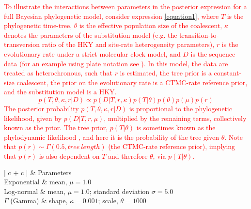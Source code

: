 \documentclass[10pt,letterpaper]{article}
\newlength\savedwidth
\newcommand\thickhline{\noalign{\global\savedwidth\arrayrulewidth\global\arrayrulewidth 2pt}%
\hline
\noalign{\global\arrayrulewidth\savedwidth}}
\begin{document}
\textcolor{red}{To illustrate the interactions between parameters in the posterior expression for a full Bayesian phylogenetic model, consider expression \ref{equation1}, where $T$ is the phylogenetic time-tree, $\theta$ is the effective population size of the coalescent, $\kappa$ denotes the parameters of the substitution model (e.g. the transition-to-transversion ratio of the HKY and site-rate heterogeneity parameters), $r$ is the evolutionary rate under a strict molecular clock model, and $D$ is the sequence data (for an example using plate notation see \cite{hohna2014probabilistic}). In this model, the data are treated as heterochronous, such that $r$ is estimated, the tree prior is a constant-size coalescent, the prior on the evolutionary rate is a CTMC-rate reference prior, and the substitution model is a HKY.
\begin{equation}
\label{equation1}
p(T, \theta, \kappa, r|D) \propto p(D|T, r, \kappa) p(T|\theta) p(\theta) p(\mu) p(r)
\end{equation}
The posterior probability $p(T, \theta, \kappa, r|D)$ is proportional to the phylogenetic likelihood, given by $p(D|T, r, \mu)$, multiplied by the remaining terms, collectively known as the prior. The tree prior, $p(T|\theta)$ is sometimes known as the phylodynamic likelihood \cite{du2015getting}, and here it is the probability of the tree given $\theta$. Note that $p(r)\sim\Gamma(0.5, tree\ length)$ (the CTMC-rate reference prior), implying that $p(r)$ is also dependent on $T$ and therefore $\theta$, via $p(T|\theta)$.}

\begin{table}[h]
\caption{Prior distributions for the effective population size of the constant-size coalescent (known as $\theta$ in the constant-size coalescent and different to the scale parameter of the $\Gamma$ distribution).}
\begin{center} 
	\label{table:prior_distros_on_Phi}
	\begin{tabular}{| c + c |}
    \hline
		 & Parameters\\ \thickhline
		Exponential & mean, $\mu=1.0$\\ \hline
		Log-normal & mean, $\mu=1.0$; standard deviation $\sigma=5.0$\\ \hline
		$\Gamma$ (Gamma) & shape, $\kappa=0.001$; scale, $\theta=1000$\\ \hline
	\end{tabular}
\end{center}
\end{table}
\end{document}
